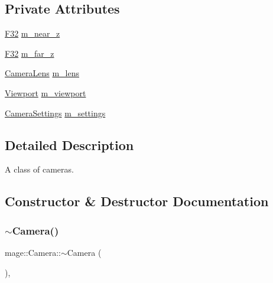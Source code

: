 \subsection*{Private Attributes}
\begin{DoxyCompactItemize}
\item 
\hyperlink{namespacemage_aa97e833b45f06d60a0a9c4fc22ae02c0}{F32} \hyperlink{classmage_1_1_camera_a8ae2c8fbe94cb6f8c4cd4a2811900b83}{m\+\_\+near\+\_\+z}
\item 
\hyperlink{namespacemage_aa97e833b45f06d60a0a9c4fc22ae02c0}{F32} \hyperlink{classmage_1_1_camera_a1073445c77b3224cd62613ae83853fe3}{m\+\_\+far\+\_\+z}
\item 
\hyperlink{classmage_1_1_camera_lens}{Camera\+Lens} \hyperlink{classmage_1_1_camera_a1fe77374724cc14506cecbc59fe77c53}{m\+\_\+lens}
\item 
\hyperlink{classmage_1_1_viewport}{Viewport} \hyperlink{classmage_1_1_camera_aab06bebec3532a3b7afe735aaf316b7d}{m\+\_\+viewport}
\item 
\hyperlink{classmage_1_1_camera_settings}{Camera\+Settings} \hyperlink{classmage_1_1_camera_a922a7d227da929739167bf1c90a14d77}{m\+\_\+settings}
\end{DoxyCompactItemize}


\subsection{Detailed Description}
A class of cameras. 

\subsection{Constructor \& Destructor Documentation}
\hypertarget{classmage_1_1_camera_aa4718c93578d160299bdc24039cc256f}{}\label{classmage_1_1_camera_aa4718c93578d160299bdc24039cc256f} 
\subsubsection{\texorpdfstring{$\sim$\+Camera()}{~Camera()}}
{\footnotesize\ttfamily mage\+::\+Camera\+::$\sim$\+Camera (\begin{DoxyParamCaption}{ }\end{DoxyParamCaption})\hspace{0.3cm}{\ttfamily [virtual]}, {\ttfamily [default]}}

